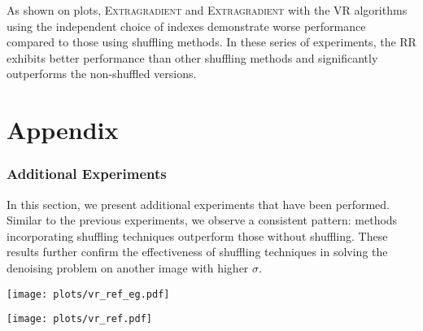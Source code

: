 \documentclass{article}
\begin{document}
As shown on plots, \textsc{Extragradient} and \textsc{Extragradient} with the VR algorithms using the independent choice of indexes demonstrate worse performance compared to those using shuffling methods. In these series of experiments, the RR exhibits better performance than other shuffling methods and significantly outperforms the non-shuffled versions.




  

\newpage

\appendix
\part*{Appendix}
\tableofcontents
\newpage

\section{Additional Experiments}\label{A}

In this section, we present additional experiments that have been performed. Similar to the previous experiments, we observe a consistent pattern: methods incorporating shuffling techniques outperform those without shuffling. These results further confirm the effectiveness of shuffling techniques in solving the denoising problem on another image with higher $\sigma$.
\begin{center}
\texttt{[image: plots/vr\_ref\_eg.pdf]}
\label{fig:egluvr}
\end{center}
\begin{center}
\texttt{[image: plots/vr\_ref.pdf]}
\label{fig:mpvrluvr}
\end{center}
\end{document}
